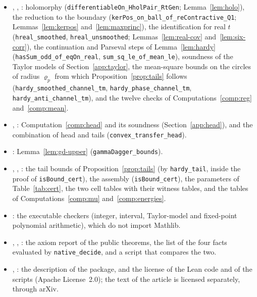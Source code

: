 \documentclass[11pt,reqno]{amsart}
\theoremstyle{definition}
\numberwithin{equation}{section}
\begin{document}
\begin{itemize}
  \item {}, , : holomorphy (\texttt{differentiableOn\_HholPair\_RtGen}; Lemma~\ref{lem:holo}), the reduction to the boundary (\texttt{kerPos\_on\_ball\_of\_reContractive\_Q1}; Lemmas~\ref{lem:kerpos} and~\ref{lem:maxprinc}), the identification for real $t$ (\texttt{hreal\_smoothed}, \texttt{hreal\_unsmoothed}; Lemmas~\ref{lem:real-cov} and~\ref{lem:six-corr}), the continuation and Parseval steps of Lemma~\ref{lem:hardy} (\texttt{hasSum\_odd\_of\_eqOn\_real}, \texttt{sum\_sq\_le\_of\_mean\_le}), soundness of the Taylor models of Section~\ref{app:taylor}, the mean-square bounds on the circles of radius $\varrho_p$ from which Proposition~\ref{prop:tails} follows (\texttt{hardy\_smoothed\_channel\_tm}, \texttt{hardy\_phase\_channel\_tm}, \texttt{hardy\_anti\_channel\_tm}), and the twelve checks of Computations~\ref{comp:reg} and~\ref{comp:mean}.
  \item {}, : Computation~\ref{comp:head} and its soundness (Section~\ref{app:head}), and the combination of head and tails (\texttt{convex\_transfer\_head}).
  \item {}: Lemma~\ref{lem:gd-upper} (\texttt{gammaDagger\_bounds}).
  \item {}, , : the tail bounds of Proposition~\ref{prop:tails} (by \texttt{hardy\_tail}, inside the proof of \texttt{isBound\_cert}), the assembly (\texttt{isBound\_cert}), the parameters of Table~\ref{tab:cert}, the two cell tables with their witness tables, and the tables of Computations~\ref{comp:mu} and~\ref{comp:energies}.
  \item {}: the executable checkers (integer, interval, Taylor-model and fixed-point polynomial arithmetic), which do not import Mathlib.
  \item {}, , : the axiom report of the public theorems, the list of the four facts evaluated by \texttt{native\_decide}, and a script that compares the two.
  \item {}, : the description of the package, and the license of the Lean code and of the scripts (Apache License~2.0); the text of the article is licensed separately, through arXiv.

\end{itemize}
\end{document}
